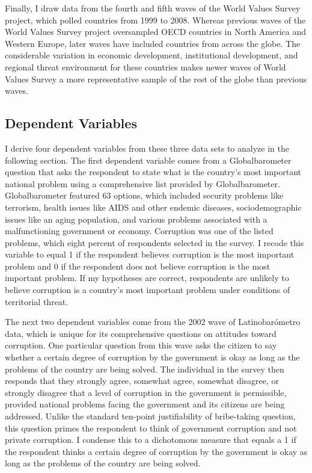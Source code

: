\documentclass[11pt,]{article}
\begin{document}
Finally, I draw data from the fourth and fifth waves of the World Values
Survey project, which polled countries from 1999 to 2008. Whereas
previous waves of the World Values Survey project oversampled OECD
countries in North America and Western Europe, later waves have included
countries from across the globe. The considerable variation in economic
development, institutional development, and regional threat environment
for these countries makes newer waves of World Values Survey a more
representative sample of the rest of the globe than previous waves.

\subsection{Dependent Variables}\label{dependent-variables}

I derive four dependent variables from these three data sets to analyze
in the following section. The first dependent variable comes from a
Globalbarometer question that asks the respondent to state what is the
country's most important national problem using a comprehensive list
provided by Globalbarometer. Globalbarometer featured 63 options, which
included security problems like terrorism, health issues like AIDS and
other endemic diseases, sociodemographic issues like an aging
population, and various problems associated with a malfunctioning
government or economy. Corruption was one of the listed problems, which
eight percent of respondents selected in the survey. I recode this
variable to equal 1 if the respondent believes corruption is the most
important problem and 0 if the respondent does not believe corruption is
the most important problem. If my hypotheses are correct, respondents
are unlikely to believe corruption is a country's most important problem
under conditions of territorial threat.

The next two dependent variables come from the 2002 wave of
Latinobarómetro data, which is unique for its comprehensive questions on
attitudes toward corruption. One particular question from this wave asks
the citizen to say whether a certain degree of corruption by the
government is okay as long as the problems of the country are being
solved. The individual in the survey then responds that they strongly
agree, somewhat agree, somewhat disagree, or strongly disagree that a
level of corruption in the government is permissible, provided national
problems facing the government and its citizens are being addressed.
Unlike the standard ten-point justifiability of bribe-taking question,
this question primes the respondent to think of government corruption
and not private corruption. I condense this to a dichotomous measure
that equals a 1 if the respondent thinks a certain degree of corruption
by the government is okay as long as the problems of the country are
being solved.
\end{document}
